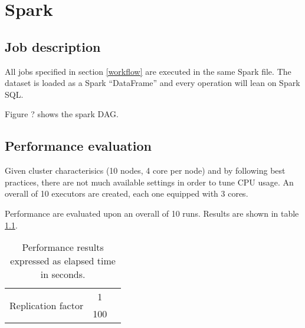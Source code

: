 \chapter{Spark}

\section{Job description}

All jobs specified in section \ref{workflow} are executed in the same Spark file. The dataset is loaded as a Spark ``DataFrame'' and every operation will lean on Spark SQL.

Figure ? shows the spark DAG. 

\section{Performance evaluation}

Given cluster characterisics (10 nodes, 4 core per node) and by following best practices, there are not much available settings in order to tune CPU usage. An overall of 10 executors are created, each one equipped with 3 cores.

Performance are evaluated upon an overall of 10 runs. Results are shown in table \ref{table:spark-perf}.

\begin{table}
  \centering
  \begin{tabular}{ |c c|c| } 
    \hline
    \multirow{2}{4em}{Replication factor} 
    & 1   &  \\      
    & 100 &  \\ 
    \hline
  \end{tabular}
  \caption{Performance results expressed as elapsed time in seconds.}
  \label{table:spark-perf}
\end{table}
